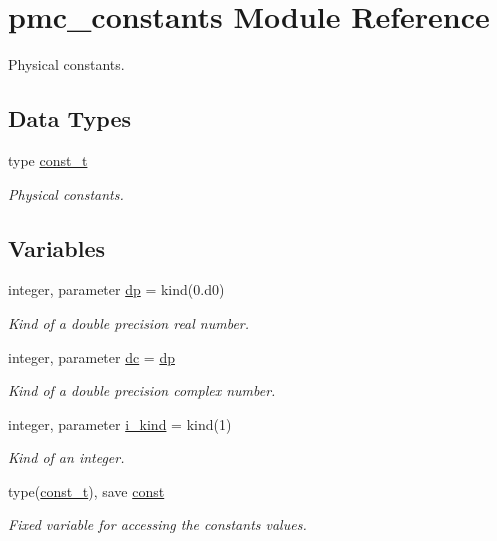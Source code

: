 \hypertarget{namespacepmc__constants}{}\section{pmc\+\_\+constants Module Reference}
\label{namespacepmc__constants}


Physical constants.  


\subsection*{Data Types}
\begin{DoxyCompactItemize}
\item 
type \mbox{\hyperlink{structpmc__constants_1_1const__t}{const\+\_\+t}}
\begin{DoxyCompactList}\small\item\em Physical constants. \end{DoxyCompactList}\end{DoxyCompactItemize}
\subsection*{Variables}
\begin{DoxyCompactItemize}
\item 
integer, parameter \mbox{\hyperlink{namespacepmc__constants_a396b7709ed4da67dac74cb46a1466ed6}{dp}} = kind(0.d0)
\begin{DoxyCompactList}\small\item\em Kind of a double precision real number. \end{DoxyCompactList}\item 
integer, parameter \mbox{\hyperlink{namespacepmc__constants_a0588e47a1de113908772c0566ff3496f}{dc}} = \mbox{\hyperlink{namespacepmc__constants_a396b7709ed4da67dac74cb46a1466ed6}{dp}}
\begin{DoxyCompactList}\small\item\em Kind of a double precision complex number. \end{DoxyCompactList}\item 
integer, parameter \mbox{\hyperlink{namespacepmc__constants_ad57f27d7f8ba14bb7c713f6603c3a532}{i\+\_\+kind}} = kind(1)
\begin{DoxyCompactList}\small\item\em Kind of an integer. \end{DoxyCompactList}\item 
type(\mbox{\hyperlink{structpmc__constants_1_1const__t}{const\+\_\+t}}), save \mbox{\hyperlink{namespacepmc__constants_a9235496969530bdb34cac4c63c1a56ed}{const}}
\begin{DoxyCompactList}\small\item\em Fixed variable for accessing the constant\textquotesingle{}s values. \end{DoxyCompactList}\end{DoxyCompactItemize}


